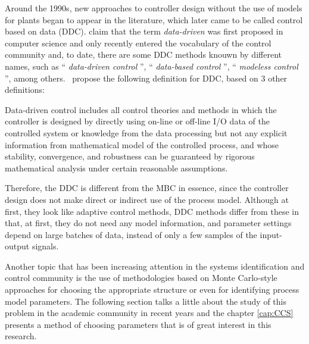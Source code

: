 Around the 1990s, new approaches to controller design without the use of models for plants began to appear in the literature, which later came to be called control based on data (DDC).
%
\cite{hou2013} claim that the term \emph{data-driven} was first proposed in computer science and only recently entered the vocabulary of the control community and, to date, there are some DDC methods knouwn by different names, such as `` \emph{data-driven control} '', `` \emph{data-based control} '', `` \emph{modeless control} '', among others.~\cite{hou2013} propose the following definition for DDC, based on 3 other definitions:


\begin{defn}\citep{hou2013}
Data-driven control includes all control theories and methods in which the controller is designed by directly using on-line or off-line I/O data of the controlled system or knowledge from the data processing but not any explicit information from mathematical model of the controlled process, and whose stability, convergence, and robustness can be guaranteed by rigorous mathematical analysis under certain reasonable assumptions.
\end{defn}

Therefore, the DDC is different from the MBC in essence, since the controller design does not make direct or indirect use of the process model.  
Although at first, they look like adaptive control methods, DDC methods differ from these in that, at first, they do not need any model information, and parameter settings depend on large batches of data, instead of only a few samples of the input-output signals. %

Another topic that has been increasing attention in the systems identification and control community is the use of methodologies based on Monte Carlo-style approaches for choosing the appropriate structure or even for identifying process model parameters. The following section talks a little about the study of this problem in the academic community in recent years and the chapter \ref{cap:CCS} presents a method of choosing parameters that is of great interest in this research.

